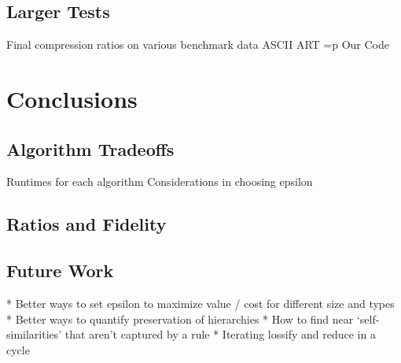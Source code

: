 \documentclass[11pt]{article}
\begin{document}
\subsection{Larger Tests}
Final compression ratios on various benchmark data
ASCII ART =p
Our Code

\section{Conclusions}
\subsection{Algorithm Tradeoffs}
Runtimes for each algorithm
Considerations in choosing epsilon
\subsection{Ratios and Fidelity}
\subsection{Future Work}
* Better ways to set epsilon to maximize value / cost for different size and types
* Better ways to quantify preservation of hierarchies
* How to find near `self-similarities' that aren't captured by a rule
* Iterating lossify and reduce in a cycle

\nocite{*}


\end{document}
